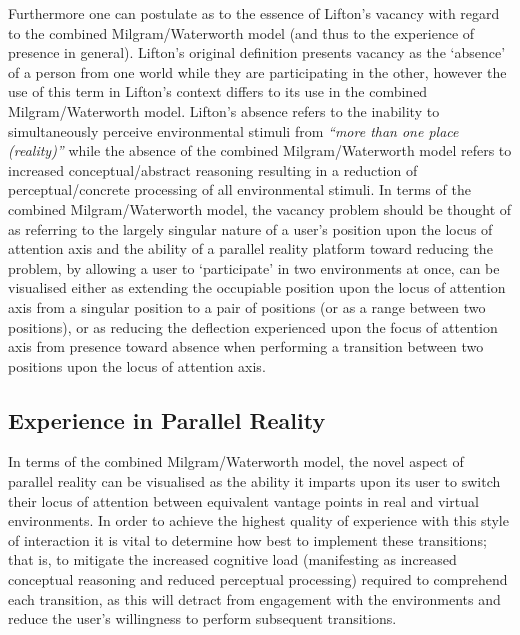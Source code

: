 Furthermore one can postulate as to the essence of Lifton's vacancy with regard to the combined Milgram/Waterworth model (and thus to the experience of presence in general). Lifton's original definition presents vacancy as the `absence' of a person from one world while they are participating in the other, however the use of this term in Lifton's context differs to its use in the combined Milgram/Waterworth model. Lifton's absence refers to the inability to simultaneously perceive environmental stimuli from \textit{``more than one place (reality)''} while the absence of the combined Milgram/Waterworth model refers to increased conceptual/abstract reasoning resulting in a reduction of perceptual/concrete processing of all environmental stimuli. In terms of the combined Milgram/Waterworth model, the vacancy problem should be thought of as referring to the largely singular nature of a user's position upon the locus of attention axis and the ability of a parallel reality platform toward reducing the problem, by allowing a user to `participate' in two environments at once, can be visualised either as extending the occupiable position upon the locus of attention axis from a singular position to a pair of positions (or as a range between two positions), or as reducing the deflection experienced upon the focus of attention axis from presence toward absence when performing a transition between two positions upon the locus of attention axis.




\subsection{Experience in Parallel Reality}

\label{transitions_in_parallel_reality}

In terms of the combined Milgram/Waterworth model, the novel aspect of parallel reality can be visualised as the ability it imparts upon its user to switch their locus of attention between equivalent vantage points in real and virtual environments. In order to achieve the highest quality of experience with this style of interaction it is vital to determine how best to implement these transitions; that is, to mitigate the increased cognitive load (manifesting as increased conceptual reasoning and reduced perceptual processing) required to comprehend each transition, as this will detract from engagement with the environments and reduce the user's willingness to perform subsequent transitions.

